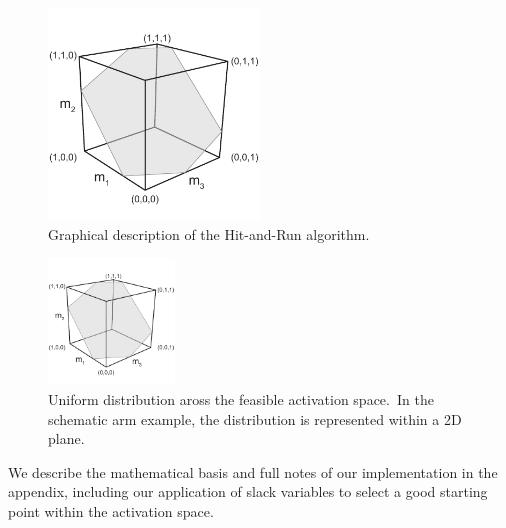 \begin{figure}[h]
\centering
\includegraphics[width=0.5\textwidth,page=10]{sections/figs/HitandRunSchematics_all.pdf}
\caption{Graphical description of the Hit-and-Run algorithm.}
\label{fig:hitruncube}
\end{figure}

\begin{figure}[h]
\centering
\includegraphics[width=0.3\textwidth,page=9]{sections/figs/HitandRunSchematics_all.pdf}
\caption{Uniform distribution aross the feasible activation space.\ In the schematic arm example, the distribution is represented within a 2D plane.}
\label{fig:posthitrun_distribution}
\end{figure}

We describe the mathematical basis and full notes of our implementation in the appendix, including our application of slack variables to select a good starting point within the activation space.

